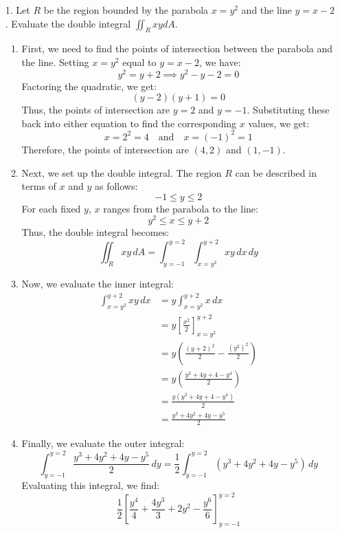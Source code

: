 \documentclass[reqno, 12pt]{amsart}
\begin{document}
\newpage
\begin{itemize}
  \item[1.] Let $R$ be the region bounded by the parabola $x = y^2$ and the line $y=x-2$. Evaluate the double integral $\displaystyle\iint_R xydA$.
    \newline

    \begin{answerbox}
      \begin{enumerate}
        \item First, we need to find the points of intersection between the parabola and the line. Setting $x = y^2$ equal to $y = x - 2$, we have:
          \[y^2 = y + 2 \implies y^2 - y - 2 = 0\]
          Factoring the quadratic, we get:
          \[(y - 2)(y + 1) = 0\]
          Thus, the points of intersection are $y = 2$ and $y = -1$. Substituting these back into either equation to find the corresponding $x$ values, we get:
          \[x = 2^2 = 4 \quad \text{and} \quad x = (-1)^2 = 1\]
          Therefore, the points of intersection are $(4, 2)$ and $(1, -1)$.
        \item Next, we set up the double integral. The region $R$ can be described in terms of $x$ and $y$ as follows:
          \[-1 \leq y \leq 2\]
          For each fixed $y$, $x$ ranges from the parabola to the line:
          \[y^2 \leq x \leq y + 2\]
          Thus, the double integral becomes:
          \[\iint_R xy \, dA = \int_{y=-1}^{y=2} \int_{x=y^2}^{y+2} xy \, dx \, dy\]
        \item Now, we evaluate the inner integral:
          \begin{align*}
            \int_{x=y^2}^{y+2} xy \, dx &= y \int_{x=y^2}^{y+2} x \, dx \\
            &= y \left[ \frac{x^2}{2} \right]_{x=y^2}^{y+2} \\
            &= y \left( \frac{(y+2)^2}{2} - \frac{(y^2)^2}{2} \right) \\
            &= y \left( \frac{y^2 + 4y + 4 - y^4}{2} \right) \\
            &= \frac{y(y^2 + 4y + 4 - y^4)}{2} \\
            &= \frac{y^3 + 4y^2 + 4y - y^5}{2}
          \end{align*}
        \item Finally, we evaluate the outer integral:
          \[\int_{y=-1}^{y=2} \frac{y^3 + 4y^2 + 4y - y^5}{2} \, dy = \frac{1}{2} \int_{y=-1}^{y=2} ( y^3 + 4y^2 + 4y - y^5 ) \, dy\]
          Evaluating this integral, we find:
          \[\frac{1}{2} \left[ \frac{y^4}{4} + \frac{4y^3}{3} + 2y^2 - \frac{y^6}{6} \right]_{y=-1}^{y=2}\]

\end{enumerate}
\end{answerbox}
\end{itemize}
\end{document}
